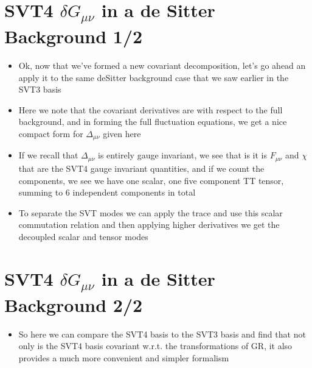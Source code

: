 \documentclass[10pt,letterpaper]{article}
\numberwithin{equation}{section}
\begin{document}
\section{SVT4 $\delta G_{\mu\nu}$ in a de Sitter Background 1/2}
\begin{itemize}
	\item Ok, now that we've formed a new covariant decomposition, let's go ahead an apply it to the same deSitter background case that we saw earlier in the SVT3 basis
	\item Here we note that the covariant derivatives are with respect to the full background, and in forming the full fluctuation equations, we get a nice compact form for $\Delta_{\mu\nu}$ given here
	\item If we recall that $\Delta_{\mu\nu}$ is entirely gauge invariant, we see that is it is $F_{\mu\nu}$ and $\chi$ that are the SVT4 gauge invariant quantities, and if we count the components, we see we have one scalar, one five component TT tensor, summing to 6 independent components in total
	\item To separate the SVT modes we can apply the trace and use this scalar commutation relation and then applying higher derivatives we get the decoupled scalar and tensor modes
\end{itemize}


\section{SVT4 $\delta G_{\mu\nu}$ in a de Sitter Background 2/2}
\begin{itemize}
	\item So here we can compare the SVT4 basis to the SVT3 basis and find that not only is the SVT4 basis covariant w.r.t. the transformations of GR, it also provides a much more convenient and simpler formalism
\end{itemize}

\end{document}
